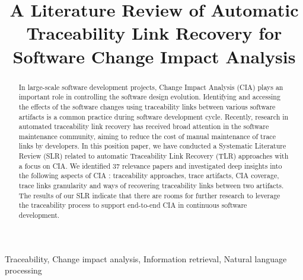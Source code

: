 \documentclass[conference]{IEEEtran}
\begin{document}
\title{A Literature Review of Automatic Traceability Link Recovery for Software Change Impact Analysis}
\author{
}
\maketitle
\begin{abstract}
In large-scale software development projects, Change  Impact  Analysis  (CIA)  plays  an important  role in  controlling  the  software  design  evolution.  Identifying  and accessing  the  effects  of  the  software  changes  using  traceability links between various software artifacts is a common practice during software  development  cycle.  Recently, research in automated  traceability  link  recovery   has  received  broad  attention  in  the  software  maintenance community,  aiming  to  reduce the cost of  manual maintenance of trace links by developers.  In  this  position  paper,  we  have conducted a Systematic   Literature   Review   (SLR)   related   to   automatic Traceability  Link  Recovery  (TLR)  approaches  with a focus  on CIA.   We   identified   37   relevance   papers   and   investigated deep  insights  into  the  following  aspects  of  CIA : traceability approaches, trace artifacts, CIA coverage, trace links granularity and ways of recovering  traceability links  between two artifacts. The results of our SLR  indicate that there are rooms for further research to leverage the traceability process to support end-to-end CIA  in continuous software development. 
\end{abstract}

\begin{IEEEkeywords}
Traceability, Change impact analysis, Information retrieval, Natural language processing
\end{IEEEkeywords}
\end{document}
